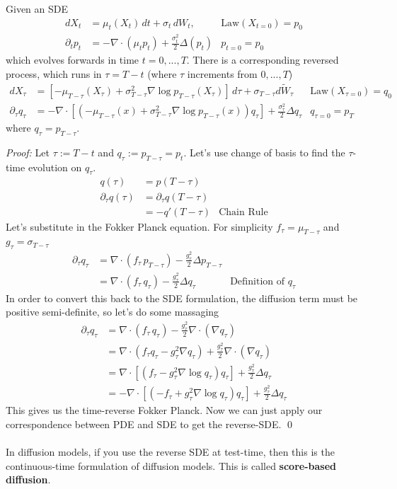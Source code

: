 \begin{theorem}
	Given an SDE 
	\begin{align}
		dX_t & = \mu_t(X_t) \, dt + \sigma_t \, dW_t,  & \text{Law}(X_{t=0})  = p_0\\
		\partial_t p_t & = - \nabla \cdot (\mu_t p_t) + \frac{\sigma_t^2}{2} \Delta ( p_t) & p_{t=0} = p_0
	\end{align}
	which evolves forwards in time $t = 0,..., T$.  There is a corresponding reversed process, which runs in $\tau = T - t$ (where $\tau$ increments from $0, ..., T$)
	\begin{align}
		dX_\tau &= [-\mu_{T-\tau}(X_\tau) + \sigma_{T-\tau}^2 \nabla \log p_{T-\tau}(X_\tau)] \, d\tau + \sigma_{T-\tau} d \tilde W_\tau & \text{Law}(X_{\tau=0}) = q_0\\
		\partial_\tau q_\tau & = - \nabla \cdot [(-\mu_{T-\tau}(x) + \sigma_{T-\tau}^2 \nabla \log p_{T-\tau}(x)) q_\tau] + \frac{\sigma_\tau^2}{2} \Delta q_\tau & q_{\tau=0} = p_T
 	\end{align}
 	where $q_{\tau} = p_{T-\tau}$.
\end{theorem}
\emph{Proof:} Let $\tau := T-t$ and $q_\tau := p_{T-\tau} = p_{t}$. Let's use change of basis to find the $\tau$-time evolution on $q_\tau$.
\begin{align}
	q(\tau) & = p(T-\tau)\\
	\partial_\tau q(\tau) & = \partial_\tau q(T-\tau) \\
	& = - q'(T-\tau)  & \text{Chain Rule}
\end{align}
Let's substitute in the Fokker Planck equation. For simplicity $f_{\tau} = \mu_{T-\tau}$ and $g_{\tau} = \sigma_{T-\tau}$
\begin{align}
	\partial_\tau q_\tau & = \nabla \cdot(f_\tau \, p_{T-\tau}) - \frac{g_\tau^2}{2} \Delta p_{T-\tau} \\
	& = \nabla \cdot(f_\tau \, q_\tau) - \frac{g_\tau^2}{2} \Delta q_\tau & \text{Definition of } q_\tau
\end{align}
In order to convert this back to the SDE formulation, the diffusion term must be positive semi-definite, so let's do some massaging
\begin{align}
	\partial_\tau q_\tau & = \nabla \cdot(f_\tau \, q_\tau) - \frac{g_\tau^2}{2} \nabla \cdot (\nabla q_\tau)\\
	& = \nabla \cdot \left(f_\tau q_\tau - g_\tau^2 \nabla q_\tau \right) + \frac{g_\tau^2}{2} \nabla \cdot (\nabla q_\tau)\\
	& = \nabla \cdot [(f_\tau - g_\tau^2 \nabla \log q_\tau)q_\tau] + \frac{g_\tau^2}{2} \Delta q_\tau\\
	& = - \nabla \cdot [(-f_\tau + g_\tau^2 \nabla \log q_\tau)q_\tau] + \frac{g_\tau^2}{2} \Delta q_\tau
\end{align}
This gives us the time-reverse Fokker Planck. Now we can just apply our correspondence between PDE and SDE to get the reverse-SDE. \qed
\\
\\
In diffusion models, if you use the reverse SDE at test-time, then this is the continuous-time formulation of diffusion models. This is called \textbf{score-based diffusion}.

